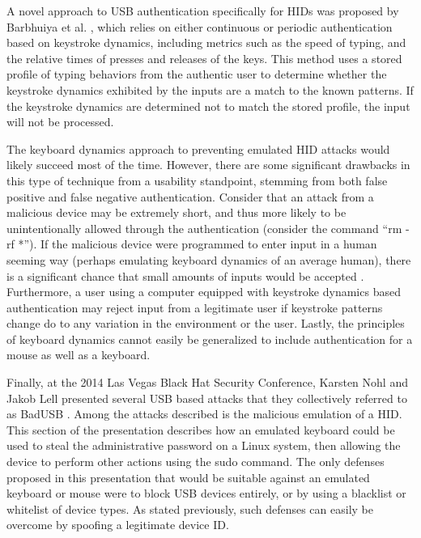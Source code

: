 \documentclass{ieee}
\begin{document}
A novel approach to USB authentication specifically for HIDs was proposed by Barbhuiya et al. \cite{barbhuiya}, which relies on either continuous or periodic authentication based on keystroke dynamics, including metrics such as the speed of typing, and the relative times of presses and releases of the keys. This method uses a stored profile of typing behaviors from the authentic user to determine whether the keystroke dynamics exhibited by the inputs are a match to the known patterns. If the keystroke dynamics are determined not to match the stored profile, the input will not be processed.

The keyboard dynamics approach to preventing emulated HID attacks would likely succeed most of the time. However, there are some significant drawbacks in this type of technique from a usability standpoint, stemming from both false positive and false negative authentication. Consider that an attack from a malicious device may be extremely short, and thus more likely to be unintentionally allowed through the authentication (consider the command ``rm -rf *''). If the malicious device were programmed to enter input in a human seeming way (perhaps emulating keyboard dynamics of an average human), there is a significant chance that small amounts of inputs would be accepted \cite{shahzad}. Furthermore, a user using a computer equipped with keystroke dynamics based authentication may reject input from a legitimate user if keystroke patterns change do to any variation in the environment or the user. Lastly, the principles of keyboard dynamics cannot easily be generalized to include authentication for a mouse as well as a keyboard.

Finally, at the 2014 Las Vegas Black Hat Security Conference, Karsten Nohl and Jakob Lell presented several USB based attacks that they collectively referred to as BadUSB \cite{nohl}. Among the attacks described is the malicious emulation of a HID. This section of the presentation describes how an emulated keyboard could be used to steal the administrative password on a Linux system, then allowing the device to perform other actions using the sudo command. The only defenses proposed in this presentation that would be suitable against an emulated keyboard or mouse were to block USB devices entirely, or by using a blacklist or whitelist of device types. As stated previously, such defenses can easily be overcome by spoofing a legitimate device ID.

\end{document}
